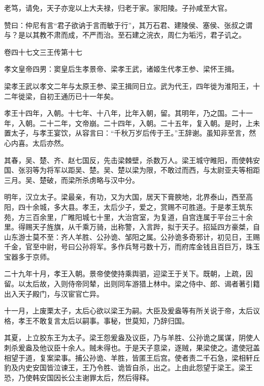 \documentclass[12pt,UTF8]{ctexbook}
\begin{document}
老笃，请免，天子亦宠以上大夫禄，归老于家。家阳陵。子孙咸至大官。



赞曰：仲尼有言“君子欲讷于言而敏于行”，其万石君、建陵侯、塞侯、张叔之谓与？是以其教不肃而成，不严而治。至石建之浣衣，周仁为垢污，君子讥之。





卷四十七文三王传第十七



孝文皇帝四男：窦皇后生孝景帝、梁孝王武，诸姬生代孝王参、梁怀王揖。



梁孝王武以孝文二年与太原王参、梁王揖同日立。武为代王，四年徙为淮阳王，十二年徙梁，自初王通历已十一年矣。



孝王十四年，入朝。十七年、十八年，比年入朝，留。其明年，乃之国。二十一年，入朝。二十二年，文帝崩。二十四年，入朝。二十五年，复入朝。是时，上未置太子，与孝王宴饮，从容言曰：“千秋万岁后传于王。”王辞谢。虽知非至言，然心内喜。太后亦然。



其春，吴、楚、齐、赵七国反，先击梁棘壁，杀数万人。梁王城守睢阳，而使韩安国、张羽等为将军以距吴、楚。吴、楚以梁为限，不敢过而西，与太尉亚夫等相距三月。吴、楚破，而梁所杀虏略与汉中分。



明年，汉立太子。梁最亲，有功，又为大国，居天下膏腴地，北界泰山，西至高阳，四十余城，多大县。孝王，太后少子，爱之，赏赐不可胜道。于是孝王筑东苑，方三百余里，广睢阳城七十里，大治宫室，为复道，自宫连属于平台三十余里。得赐天子旌旗，从千乘万骑，出称警，入言跸，拟于天子。招延四方豪桀，自山东游士莫不至：齐人羊胜、公孙诡、邹阳之属。公孙诡多奇邪计，初见日，王赐千金，官至中尉，号曰公孙将军。多作兵弩弓数十万，而府库金钱且百巨万，珠玉宝器多于京师。



二十九年十月，孝王入朝。景帝使使持乘舆驷，迎梁王于关下。既朝，上疏，因留。以太后故，入则侍帝同辇，出则同车游猎上林中。梁之侍中、郎、谒者著引籍出入天子殿门，与汉宦官亡异。



十一月，上废栗太子，太后心欲以梁王为嗣。大臣及爰盎等有所关说于帝，太后议格，孝王不敢复言太后以嗣事。事秘，世莫知，乃辞归国。



其夏，上立胶东王为太子。梁王怨爰盎及议臣，乃与羊胜、公孙诡之属谋，阴使人刺杀爰盎及他议臣十余人。贼未得也。于是天子意梁，逐贼，果梁使之。遣使冠盖相望于道，复案梁事。捕公孙诡、羊胜，皆匿王后宫。使者责二千石急，梁相轩丘豹及内史安国皆泣谏王，王乃令胜、诡皆自杀，出之。上由此怨望于梁王。梁王恐，乃使韩安国因长公主谢罪太后，然后得释。
\end{document}
